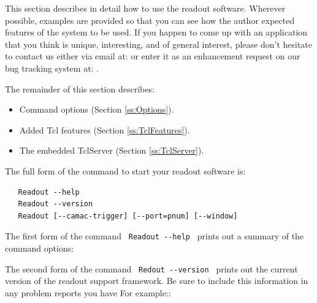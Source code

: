    
   This section describes in detail how to use the readout software.   Wherever
   possible, examples are provided so that you can see how the author expected
   features of the system to be used.  If you happen to come up with an application
   that you think is unique, interesting, and of general interest, please don't hesitate
   to contact us either via email at:
   or enter it as an enhancement request on our bug tracking system at:
   .
   
   \begin{iftex}
   The remainder of this section describes:
   \begin{itemize}
      \item Command options (Section \ref{ss:Options}).
      \item Added Tcl features (Section \ref{ss:TclFeatures}).
      \item The embedded TclServer (Section \ref{ss:TclServer}).
      
   \end{itemize}
   \end{iftex}
   
   The full form of the command to start your readout software is:
   \begin{verbatim}
   Readout --help
   Readout --version
   Readout [--camac-trigger] [--port=pnum] [--window]
   \end{verbatim}

   The first form of the command \verb+ Readout --help + prints out
   a summary of the command options:
   \begin{example}
   \end{example}
   
   The second form of the command \verb+ Redout --version + prints out 
   the current version of the readout support framework.  Be sure to
   include this information in any problem reports you have For example::
   
